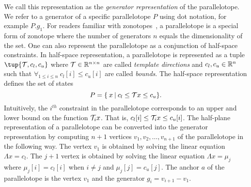 We call this representation as the \emph{generator representation} of the parallelotope.
%
We refer to a generator of a specific parallelotope $P$ using dot notation, for example $P.g_1$.
%
For readers familiar with zonotopes~\cite{girard2005reachability,althoff2010computing}, a parallelotope is a special form of zonotope where the number of generators $n$ equals the dimensionality of the set.
%
One can also represent the parallelotope as a conjunction of half-space constraints.
%
In half-space representation, a parallelotope is represented as a tuple $\tup{\T, c_{l}, c_{u}}$ where $\T \in \reals^{n \times n}$ are called \emph{template directions} and $c_{l}, c_{u} \in \reals^{n}$ such that $\forall_{1 \leq i \leq n} ~  c_{l}[i] \leq c_{u}[i]$ are called \emph{bounds}. The half-space representation defines the set of states
%
$$
P = \{\: x\: | \: c_{l} \leq {\cal T} x \leq c_{u} \}.
$$
%
%
Intuitively, the $i^{th}$ constraint in the parallelotope corresponds to an upper and lower bound on the function ${\cal T}_{i} x$.
%
That is, $c_{l}[i] \leq {\cal T}_{i}x \leq c_{u}[i]$.
%
The half-plane representation of a parallelotope can be converted into the generator representation by computing $n+1$ vertices $v_1, v_2, \ldots, v_{n+1}$ of the parallelotope in the following way.
%
The vertex $v_1$ is obtained by solving the linear equation $\Lambda x = c_{l}$.
%
The $j+1$ vertex is obtained by solving the linear equation $\Lambda x = \mu_{j}$ where $\mu_{j}[i] = c_{l}[i]$ when $i \neq j$ and $\mu_{j}[j] = c_{u}[j]$.
%
The anchor $a$ of the parallelotope is the vertex $v_1$ and the generator $g_{i} = v_{i+1} - v_{1}$.

